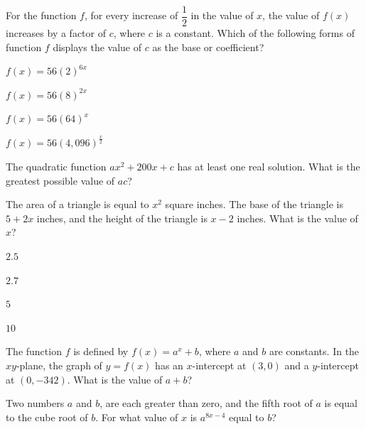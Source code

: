 \vfill
\noindent\begin{minipage}{\linewidth}
\par\smallskip
For the function $f$, for every increase of $\dfrac{1}{2}$ in the value of $x$, the value of $f(x)$ increases by a factor of $c$, where $c$ is a constant. Which of the following forms of function $f$ displays the value of $c$ as the base or coefficient?
\begin{satchoices}
  \item[A)] $f(x)=56(2)^{6x}$
  \item[B)] $f(x)=56(8)^{2x}$
  \item[C)] $f(x)=56(64)^x$
  \item[D)] $f(x)=56(4{,}096)^{\frac{x}{2}}$
\end{satchoices}
\end{minipage}
\vfill
\noindent\begin{minipage}{\linewidth}
\par\smallskip
The quadratic function $ax^2+200x+c$ has at least one real solution. What is the greatest possible value of $ac$?
\end{minipage}
\vfill
\clearpage
\noindent\begin{minipage}{\linewidth}
\par\smallskip
The area of a triangle is equal to $x^2$ square inches. The base of the triangle is $5+2x$ inches, and the height of the triangle is $x-2$ inches. What is the value of $x$?
\begin{satchoices}
  \item[A)] $2.5$
  \item[B)] $2.7$
  \item[C)] $5$
  \item[D)] $10$
\end{satchoices}
\end{minipage}
\vfill
\noindent\begin{minipage}{\linewidth}
\par\smallskip
The function $f$ is defined by $f(x)=a^x+b$, where $a$ and $b$ are constants. In the $xy$-plane, the graph of $y=f(x)$ has an $x$-intercept at $(3,0)$ and a $y$-intercept at $(0,-342)$. What is the value of $a+b$?
\end{minipage}
\vfill
\noindent\begin{minipage}{\linewidth}
\par\smallskip
Two numbers $a$ and $b$, are each greater than zero, and the fifth root of $a$ is equal to the cube root of $b$. For what value of $x$ is $a^{8x-4}$ equal to $b$?
\end{minipage}

